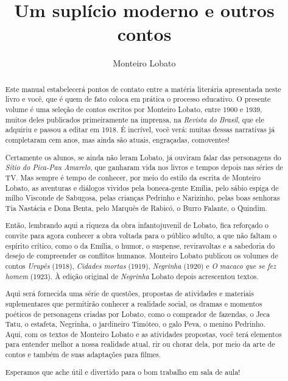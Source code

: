 \documentclass[11pt]{extarticle}
\begin{document}
\newcommand{\AutorLivro}{Monteiro Lobato}
\newcommand{\TituloLivro}{Um suplício moderno e outros contos}
\newcommand{\Tema}{Ficção, mistério e fantasia}
\newcommand{\Genero}{Conto, crônica e novela}
\newcommand{\imagemCapa}{./images/PNLD0024-01.png}
\newcommand{\issnppub}{---}
\newcommand{\issnepub}{---}
\newcommand{\colaborador}{\textbf{Ieda Lebensztayn}}


\title{\TituloLivro}
\author{\AutorLivro}
\def\authornotes{\colaborador}

\date{}
\maketitle

\begin{abstract}

Este manual estabelecerá pontos de contato entre a matéria literária
apresentada neste livro e você, que é quem de fato coloca em prática o
processo educativo. O presente volume é uma seleção de contos escritos
por Monteiro Lobato, entre 1900 e 1939, muitos deles publicados
primeiramente na imprensa, na \emph{Revista do Brasil}, que ele adquiriu
e passou a editar em 1918. É incrível, você verá: muitas dessas
narrativas já completaram cem anos, mas ainda são atuais, engraçadas,
comoventes!

Certamente os alunos, se ainda não leram Lobato, já ouviram falar das
personagens do \emph{Sítio do Pica-Pau Amarelo}, que ganharam vida nos
livros e tempos depois nas séries de TV. Mas sempre é tempo de conhecer,
por meio do estilo da escrita de Monteiro Lobato, as aventuras e
diálogos vividos pela boneca-gente Emília, pelo sábio espiga de milho
Visconde de Sabugosa, pelas crianças Pedrinho e Narizinho, pelas boas
senhoras Tia Nastácia e Dona Benta, pelo Marquês de Rabicó, o Burro
Falante, o Quindim.

Então, lembrando aqui a riqueza da obra infantojuvenil de Lobato, fica
reforçado o convite para agora conhecer a obra voltada para o público
adulto, a que não faltam o espírito crítico, como o da Emília, o humor,
o suspense, reviravoltas e a sabedoria do desejo de compreender os
conflitos humanos. Monteiro Lobato publicou os volumes de contos
\emph{Urupês} (1918), \emph{Cidades mortas} (1919), \emph{Negrinha}
(1920) e \emph{O macaco que se fez homem} (1923). À edição original de
\emph{Negrinha} Lobato depois acrescentou textos.

Aqui será fornecida uma série de questões, propostas de atividades e
materiais suplementares que permitirão conhecer a realidade social, os
dramas e momentos poéticos de personagens criadas por Lobato, como o
comprador de fazendas, o Jeca Tatu, o estafeta, Negrinha, o jardineiro
Timóteo, o galo Peva, o menino Pedrinho. Aqui, com os textos de Monteiro
Lobato e as atividades propostas, você terá elementos para entender
melhor a nossa realidade atual, rir ou chorar dela, por meio da arte de
contos e também de suas adaptações para filmes.

Esperamos que ache útil e divertido para o bom trabalho em sala de aula!
\end{abstract}
\end{document}
